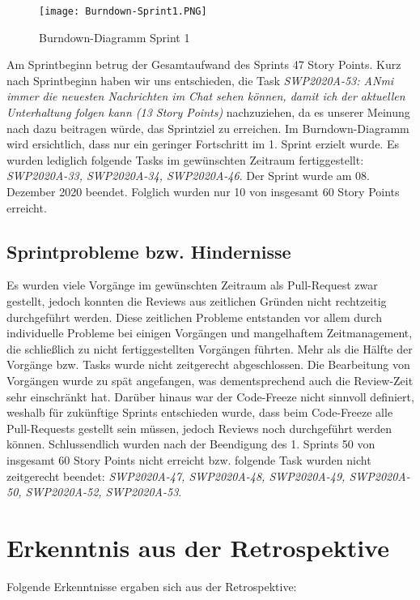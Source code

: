 \documentclass[12pt,a4paper, oneside]{article}
\begin{document}
    \begin{figure}[h]
        \centering
        \texttt{[image: Burndown-Sprint1.PNG]}
        \caption{Burndown-Diagramm Sprint 1}
        \label{fig: Burndown-Sprint1}
    \end{figure}

    \noindent
    Am Sprintbeginn betrug der Gesamtaufwand des Sprints 47 Story Points. Kurz nach Sprintbeginn haben wir uns entschieden, die Task \textit{SWP2020A-53: ANmi immer die neuesten Nachrichten im Chat sehen können, damit ich der aktuellen Unterhaltung folgen kann (13 Story Points)} nachzuziehen, da es unserer Meinung nach dazu beitragen würde, das Sprintziel zu erreichen. Im Burndown-Diagramm wird ersichtlich, dass nur ein geringer Fortschritt im 1. Sprint erzielt wurde. Es wurden lediglich folgende Tasks im gewünschten Zeitraum fertiggestellt: \textit{SWP2020A-33, SWP2020A-34, SWP2020A-46}. Der Sprint wurde am 08. Dezember 2020 beendet. Folglich wurden nur 10 von insgesamt 60 Story Points erreicht.

    \subsection{Sprintprobleme bzw. Hindernisse}
    Es wurden viele Vorgänge im gewünschten Zeitraum als Pull-Request zwar gestellt, jedoch konnten die Reviews aus zeitlichen Gründen nicht rechtzeitig durchgeführt werden. Diese zeitlichen Probleme entstanden vor allem durch individuelle Probleme bei einigen Vorgängen und mangelhaftem Zeitmanagement, die schließlich zu nicht fertiggestellten Vorgängen führten. Mehr als die Hälfte der Vorgänge bzw. Tasks wurde nicht zeitgerecht abgeschlossen. Die Bearbeitung von Vorgängen wurde zu spät angefangen, was dementsprechend auch die Review-Zeit sehr einschränkt hat. Darüber hinaus war der Code-Freeze nicht sinnvoll definiert, weshalb für zukünftige Sprints entschieden wurde, dass beim Code-Freeze alle Pull-Requests gestellt sein müssen, jedoch Reviews noch durchgeführt werden können. Schlussendlich wurden nach der Beendigung des 1. Sprints 50 von insgesamt 60 Story Points nicht erreicht bzw. folgende Task wurden nicht zeitgerecht beendet: \textit{SWP2020A-47, SWP2020A-48, SWP2020A-49, SWP2020A-50, SWP2020A-52, SWP2020A-53}.

    \section{Erkenntnis aus der Retrospektive}
    Folgende Erkenntnisse ergaben sich aus der Retrospektive:\\
\end{document}
